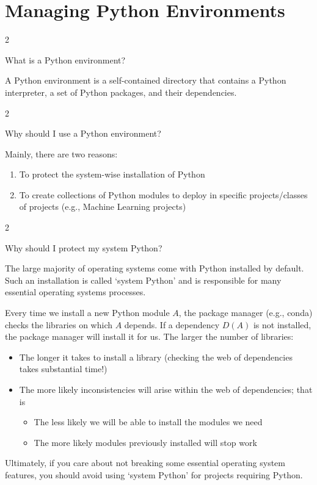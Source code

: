\documentclass[a4paper,11pt]{book}
\newcommand{\question}[1]{%
    \begin{tcolorbox}[colback=comp_c!10,colframe=comp_c,sidebyside align=top,width=\linewidth,before skip=1ex]
        #1
    \end{tcolorbox}
    \switchcolumn%
}
\newcommand{\note}[1]{%
    \begin{tcolorbox}[colback=white!0,colframe=white!10,width=\linewidth,before skip=1ex]
        #1
    \end{tcolorbox}
}
\begin{document}
\section{Managing Python Environments}

\begin{paracol}{2}
	\question{\raggedright What is a Python environment?}
	\note{A Python environment is a self-contained directory that contains a Python interpreter, a set of Python packages, and their dependencies.
	}
\end{paracol}

\begin{paracol}{2}
	\question{\raggedright Why should I use a Python environment?}
	\note{Mainly, there are two reasons:
	\begin{enumerate}
		\item To protect the system-wise installation of Python
		\item To create collections of Python modules to deploy in specific projects/classes of projects (e.g., Machine Learning projects)
	\end{enumerate}
	}
\end{paracol}

\begin{paracol}{2}
	\question{\raggedright Why should I protect my system Python?}
	\note{
	The large majority of operating systems come with Python installed by default. Such an installation is called `system Python' and is responsible for many essential operating systems processes. 

	\quad Every time we install a new Python module $A$, the package manager (e.g., conda) checks the libraries on which $A$ depends. If a dependency $D(A)$ is not installed, the package manager will install it for us. The larger the number of libraries:
	\begin{itemize}
		\item The longer it takes to install a library (checking the web of dependencies takes substantial time!)
		\item The more likely inconsistencies will arise within the web of dependencies; that is
		\begin{itemize}
		\item The less likely we will be able to install the modules we need
		\item The more likely modules previously installed will stop work
		\end{itemize}
	\end{itemize}
	Ultimately, if you care about not breaking some essential operating system features, you should avoid using `system Python' for projects requiring Python.
	}
\end{paracol}
\clearpage
\end{document}
